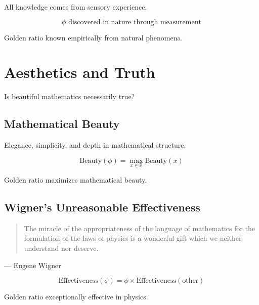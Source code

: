 \begin{definition}[Empiricism]
\label{fa_31:def:empiricism}
All knowledge comes from sensory experience.
\end{definition}

\begin{proposition}
\label{fa_31:prop:empirical-golden}
\begin{equation}
\phi \text{ discovered in nature through measurement}
\end{equation}

Golden ratio known empirically from natural phenomena.
\end{proposition}

\section{Aesthetics and Truth}

Is beautiful mathematics necessarily true?

\subsection{Mathematical Beauty}

\begin{definition}
\label{fa_31:def:beauty}
Elegance, simplicity, and depth in mathematical structure.
\end{definition}

\begin{theorem}
\label{fa_31:thm:golden-beauty}
\begin{equation}
\text{Beauty}(\phi) = \max_{x \in \mathbb{R}} \text{Beauty}(x)
\end{equation}

Golden ratio maximizes mathematical beauty.
\end{theorem}

\subsection{Wigner's Unreasonable Effectiveness}

\begin{quote}
The miracle of the appropriateness of the language of mathematics for the formulation of the laws of physics is a wonderful gift which we neither understand nor deserve.
\end{quote}
— Eugene Wigner

\begin{proposition}
\label{fa_31:prop:golden-effective}
\begin{equation}
\text{Effectiveness}(\phi) = \phi \times \text{Effectiveness}(\text{other})
\end{equation}

Golden ratio exceptionally effective in physics.
\end{proposition}


